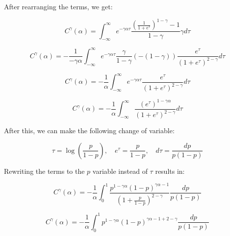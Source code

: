 \documentclass{article}
\theoremstyle{definition}
\begin{document}
After rearranging the terms, we get:

\begin{equation}
    C^\gamma(\alpha) = \int_{-\infty}^\infty e^{-\gamma \alpha \tau} 
    \frac{\left ( \frac{1}{1 + e^{\tau}} \right )^{1-\gamma}-1}{1-\gamma} 
    \gamma d \tau
\end{equation}

\begin{equation}
    C^\gamma(\alpha) = - \frac{1}{-\gamma \alpha} \int_{-\infty}^\infty e^{-\gamma \alpha \tau}
    \frac{\gamma}{1-\gamma}
    (-(1-\gamma))
    \frac{e^\tau}{
    \left (
    1+e^\tau
    \right )^{2-\gamma}
    }
    d \tau
\end{equation}

\begin{equation}
    C^\gamma(\alpha) = - \frac{1}{\alpha} \int_{-\infty}^\infty e^{-\gamma \alpha \tau}
    \frac{e^\tau}{
    \left (
    1+e^\tau
    \right )^{2-\gamma}
    }
    d \tau
\end{equation}

\begin{equation}
    \label{eq:CgammaExp}
    C^\gamma(\alpha) = - \frac{1}{\alpha} \int_{-\infty}^\infty
    \frac{\left ( e^\tau \right )^{1-\gamma \alpha}}{
    \left (
    1+e^\tau
    \right )^{2-\gamma}
    }
    d \tau
\end{equation}

After this, we can make the following change of variable:

\begin{equation}
    \tau = \log \left ( \frac{p}{1-p} \right ), \quad
    e^\tau = \frac{p}{1-p},
    \quad
    d \tau = \frac{dp}{p (1-p)}
\end{equation}

Rewriting the terms to the $p$ variable instead of $\tau$ results in:

\begin{equation}
    C^\gamma(\alpha) = - \frac{1}{\alpha} \int_{0}^1
    \frac{
     p^{1-\gamma \alpha}
    \left ( 1-p \right )^{\gamma \alpha-1}
    }{
    \left (
    1+\frac{p}{1-p}
    \right )^{2-\gamma}
    }
    \frac{dp}{p (1-p)}
\end{equation}

\begin{equation}
    C^\gamma(\alpha) = - \frac{1}{\alpha} \int_{0}^1
     p^{1-\gamma \alpha}
    \left ( 1-p \right )^{\gamma \alpha-1+2-\gamma}
    \frac{dp}{p (1-p)}
\end{equation}
\end{document}
